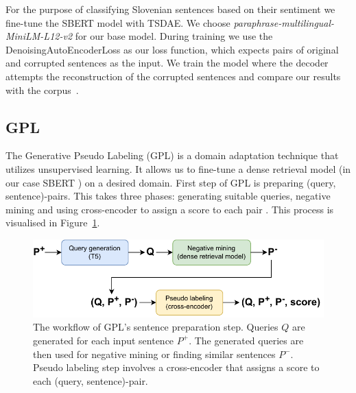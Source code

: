 \documentclass[fleqn,moreauthors,10pt]{ds_report}
\begin{document}
For the purpose of classifying Slovenian sentences based on their sentiment we fine-tune the SBERT model with TSDAE. We choose \textit{paraphrase-multilingual-MiniLM-L12-v2} for our base model. During training we use the DenoisingAutoEncoderLoss as our loss function, which expects pairs of original and corrupted sentences as the input. We train the model where the decoder attempts the reconstruction of the corrupted sentences and compare our results with the corpus~\cite{SentenceTransformers}.



\subsection*{GPL}

The Generative Pseudo Labeling (GPL) is a domain adaptation technique that utilizes unsupervised learning. It allows us to fine-tune a dense retrieval model (in our case SBERT \cite{SBERT}) on a desired domain. First step of GPL is preparing (query, sentence)-pairs. This takes three phases: generating suitable queries, negative mining and using cross-encoder to assign a score to each pair \cite{GPL}. This process is visualised in Figure~\ref{fig:GPL}.

\begin{figure}[ht]\centering
	\vspace{12 pt}
	\includegraphics[width=\linewidth]{GPL_data_preprocessing.pdf}
	\vspace{5 pt}
	\caption{The workflow of GPL's sentence preparation step. Queries $Q$ are generated for each input sentence $P^{+}$. The generated queries are then used for negative mining or finding similar sentences $P^{-}$. Pseudo labeling step involves a cross-encoder that assigns a score to each (query, sentence)-pair.}
	\label{fig:GPL}
\end{figure}
\end{document}
